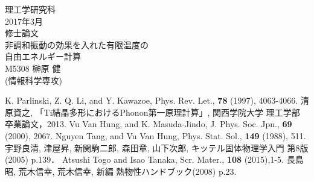 \documentclass[12pt,a4]{jreport}%
\begin{document}
\begin{titlepage}
    \begin{center}
    \null
    \LARGE 理工学研究科\\
            \vspace{1.5cm}
    \LARGE 2017年3月\\
            \vspace{1.5cm}
    \LARGE 修士論文\\
            \vspace{2cm}
    \huge 非調和振動の効果を入れた有限温度の\\自由エネルギー計算\\
            \vspace{6cm}%
    \LARGE M5308   榊原 健\\(情報科学専攻)
    \end{center}
\end{titlepage}



\tableofcontents


\begin{thebibliography}{9}
K. Parlinski, Z. Q. Li, and Y. Kawazoe, Phys. Rev. Let., {\bf 78} (1997), 4063-4066.
清原資之, 「Ti結晶多形におけるPhonon第一原理計算」, 関西学院大学 理工学部 卒業論文，2013. 
Vu Van Hung, and K. Masuda-Jindo, J. Phys. Soc. Jpn., {\bf 69} (2000), 2067.
Nguyen Tang, and Vu Van Hung, Phys. Stat. Sol., {\bf 149} (1988), 511.
宇野良清, 津屋昇, 新関駒二郎, 森田章, 山下次郎, キッテル固体物理学入門 第8版(2005) p.139．
Atsushi Togo and Isao Tanaka, Scr. Mater., {\bf108} (2015),1-5.
長島昭, 荒木信幸, 荒木信幸, 新編 熱物性ハンドブック(2008) p.23.
\end{thebibliography}
\end{document}
